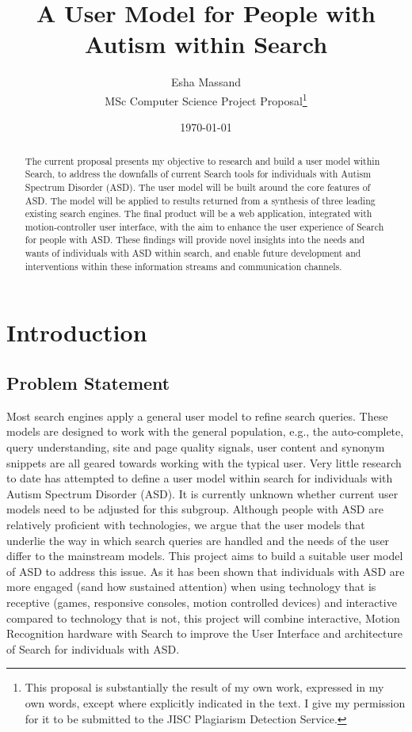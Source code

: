 \documentclass[10pt]{article}
\begin{document}
\title{A User Model for People with Autism within Search }
\author{Esha Massand\\
MSc Computer Science Project Proposal\footnote{This proposal is substantially the result of my own work, expressed in my own words, except where explicitly indicated in the text. I give my permission for it to be submitted to the JISC Plagiarism Detection Service. }}
\date{\today}
\maketitle

\begin{abstract}
The current proposal presents my objective to research and build a user model within Search, to address the downfalls of current Search tools for individuals with Autism Spectrum Disorder (ASD). The user model will be built around the core features of ASD. The model will be applied to results returned from a synthesis of three leading existing search engines. The final product will be a web application, integrated with motion-controller user interface, with the aim to enhance the user experience of Search for people with ASD. These findings will provide novel insights into the needs and wants of individuals with ASD within search, and enable future development and interventions within these information streams and communication channels.
\end{abstract}

\tableofcontents

\section{Introduction}
\subsection{Problem Statement} \label{prob}
Most search engines apply a general user model to refine search queries. These models are designed to work with the general population, e.g., the auto-complete, query understanding, site and page quality signals, user content and synonym snippets are all geared towards working with the typical user. Very little research to date has attempted to define a user model within search for individuals with Autism Spectrum Disorder (ASD). It is currently unknown whether current user models need to be adjusted for this subgroup. Although people with ASD are relatively proficient with technologies, we argue that the user models that underlie the way in which search queries are handled and the needs of the user differ to the mainstream models. This project aims to build a suitable user model of ASD to address this issue.
As it has been shown that individuals with ASD are more engaged (sand how sustained attention) when using technology that is receptive (games, responsive consoles, motion controlled devices) and interactive compared to technology that is not, this project will combine interactive, Motion Recognition hardware with Search to improve the User Interface and architecture of Search for individuals with ASD.
\end{document}

